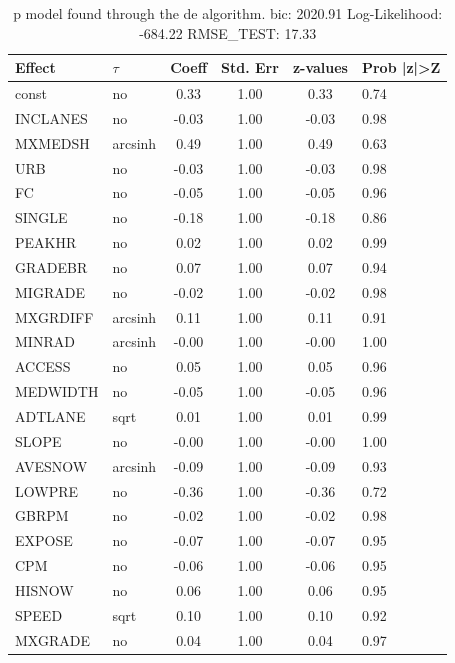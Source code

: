 \begin{table}
	\caption{p model found through the de algorithm. bic: 2020.91 Log-Likelihood: -684.22 RMSE_TEST: 17.33}
	\begin{center}
		\begin{tabular}{|l|l|c|c|c|l|}
			\hline
			Effect & $\tau$ & Coeff & Std. Err & z-values & Prob |z|>Z \\
			\hline
			const & no & 0.33 & 1.00 & 0.33 & 0.74 \\
			\hline
			INCLANES & no & -0.03 & 1.00 & -0.03 & 0.98 \\
			\hline
			MXMEDSH & arcsinh & 0.49 & 1.00 & 0.49 & 0.63 \\
			\hline
			URB & no & -0.03 & 1.00 & -0.03 & 0.98 \\
			\hline
			FC & no & -0.05 & 1.00 & -0.05 & 0.96 \\
			\hline
			SINGLE & no & -0.18 & 1.00 & -0.18 & 0.86 \\
			\hline
			PEAKHR & no & 0.02 & 1.00 & 0.02 & 0.99 \\
			\hline
			GRADEBR & no & 0.07 & 1.00 & 0.07 & 0.94 \\
			\hline
			MIGRADE & no & -0.02 & 1.00 & -0.02 & 0.98 \\
			\hline
			MXGRDIFF & arcsinh & 0.11 & 1.00 & 0.11 & 0.91 \\
			\hline
			MINRAD & arcsinh & -0.00 & 1.00 & -0.00 & 1.00 \\
			\hline
			ACCESS & no & 0.05 & 1.00 & 0.05 & 0.96 \\
			\hline
			MEDWIDTH & no & -0.05 & 1.00 & -0.05 & 0.96 \\
			\hline
			ADTLANE & sqrt & 0.01 & 1.00 & 0.01 & 0.99 \\
			\hline
			SLOPE & no & -0.00 & 1.00 & -0.00 & 1.00 \\
			\hline
			AVESNOW & arcsinh & -0.09 & 1.00 & -0.09 & 0.93 \\
			\hline
			LOWPRE & no & -0.36 & 1.00 & -0.36 & 0.72 \\
			\hline
			GBRPM & no & -0.02 & 1.00 & -0.02 & 0.98 \\
			\hline
			EXPOSE & no & -0.07 & 1.00 & -0.07 & 0.95 \\
			\hline
			CPM & no & -0.06 & 1.00 & -0.06 & 0.95 \\
			\hline
			HISNOW & no & 0.06 & 1.00 & 0.06 & 0.95 \\
			\hline
			SPEED & sqrt & 0.10 & 1.00 & 0.10 & 0.92 \\
			\hline
			MXGRADE & no & 0.04 & 1.00 & 0.04 & 0.97 \\

\end{tabular}
\end{center}
\end{table}
